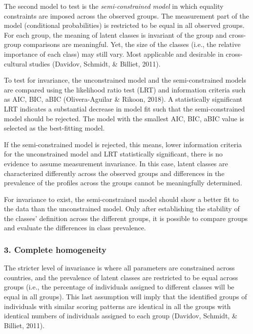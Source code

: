 \documentclass[12pt,a4paper,oneside]{reedthesis}
\begin{document}
The second model to test is the \emph{semi-constrained model} in which equality constraints are imposed across the observed groups. The measurement part of the model (conditional probabilities) is restricted to be equal in all observed groups. For each group, the meaning of latent classes is invariant of the group and cross-group comparisons are meaningful. Yet, the size of the classes (i.e., the relative importance of each class) may still vary. Most applicable and desirable in cross-cultural studies (Davidov, Schmidt, \& Billiet, 2011).

To test for invariance, the unconstrained model and the semi-constrained models are compared using the likelihood ratio test (LRT) and information criteria such as AIC, BIC, aBIC (Olivera-Aguilar \& Rikoon, 2018). A statistically significant LRT indicates a substantial decrease in model fit such that the semi-constrained model should be rejected. The model with the smallest AIC, BIC, aBIC value is selected as the best-fitting model.

If the semi-constrained model is rejected, this means, lower information criteria for the unconstrained model and LRT statistically significant, there is no evidence to assume measurement invariance. In this case, latent classes are characterized differently across the observed groups and differences in the prevalence of the profiles across the groups cannot be meaningfully determined.

For invariance to exist, the semi-constrained model should show a better fit to the data than the unconstrained model. Only after establishing the stability of the classes' definition across the different groups, it is possible to compare groups and evaluate the differences in class prevalence.

\hypertarget{complete-homogeneity}{%
\subsubsection{3. Complete homogeneity}\label{complete-homogeneity}}

The stricter level of invariance is where all parameters are constrained across countries, and the prevalence of latent classes are restricted to be equal across groups (i.e., the percentage of individuals assigned to different classes will be equal in all groups). This last assumption will imply that the identified groups of individuals with similar scoring patterns are identical in all the groups with identical numbers of individuals assigned to each group (Davidov, Schmidt, \& Billiet, 2011).
\end{document}

